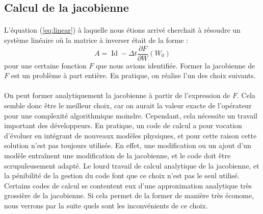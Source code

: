   \subsection{Calcul de la jacobienne}

    \paragraph{}
    L'équation (\ref{eq:linear}) à laquelle nous étions arrivé cherchait à résoudre un système linéaire où la matrice à inverser était de la forme :
    \[A = \operatorname{Id} - \Delta t\frac{\partial F}{\partial W}\left(W_0\right)\]
    pour une certaine fonction $F$ que nous avions identifiée.
    Former la jacobienne de $F$ est un problème à part entière.
    En pratique, on réalise l'un des choix suivants.

    \paragraph{}
    On peut former analytiquement la jacobienne à partir de l'expression de $F$.
    Cela semble donc être le meilleur choix, car on aurait la valeur exacte de l'opérateur pour une complexité algorithmique moindre.
    Cependant, cela nécessite un travail important des développeurs.
    En pratique, un code de calcul a pour vocation d'évoluer en intégrant de nouveaux modèles physiques, et pour cette raison cette solution n'est pas toujours utilisée.
    En effet, une modification ou un ajout d'un modèle entraînent une modification de la jacobienne, et le code doit être scrupuleusement adapté.
    Le lourd travail de calcul analytique de la jacobienne, et la pénibilité de la gestion du code font que ce choix n'est pas le seul utilisé.
    Certains codes de calcul se contentent eux d'une approximation analytique très grossière de la jacobienne.
    Si cela permet de la former de manière très économe, nous verrons par la suite quels sont les inconvénients de ce choix.

